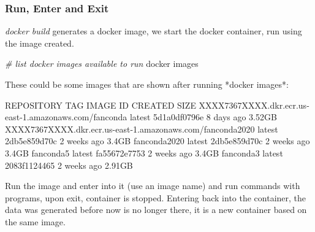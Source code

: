 \documentclass[
]{book}
\newenvironment{Shaded}{\begin{snugshade}}{\end{snugshade}}
\newcommand{\CommentTok}[1]{\textcolor[rgb]{0.56,0.35,0.01}{\textit{#1}}}
\newcommand{\ExtensionTok}[1]{#1}
\newcommand{\NormalTok}[1]{#1}
\begin{document}
\hypertarget{run-enter-and-exit}{%
\subsubsection{Run, Enter and Exit}\label{run-enter-and-exit}}

\emph{docker build} generates a docker image, we start the docker container, run using the image created.

\begin{Shaded}
\begin{Highlighting}[]
\CommentTok{\# list docker images available to run}
\ExtensionTok{docker}\NormalTok{ images}
\end{Highlighting}
\end{Shaded}

\begin{Shaded}
\begin{Highlighting}[]
\ExtensionTok{These}\NormalTok{ could be some images that are shown after running *docker images*:}

\ExtensionTok{REPOSITORY}\NormalTok{                                                     TAG                 IMAGE ID            CREATED             SIZE}
\ExtensionTok{XXXX7367XXXX.dkr.ecr.us{-}east{-}1.amazonaws.com/fanconda}\NormalTok{       latest              5d1a0df0796e        8 days ago          3.52GB}
\ExtensionTok{XXXX7367XXXX.dkr.ecr.us{-}east{-}1.amazonaws.com/fanconda2020}\NormalTok{   latest              2db5e859d70c        2 weeks ago         3.4GB}
\ExtensionTok{fanconda2020}\NormalTok{                                                latest              2db5e859d70c        2 weeks ago         3.4GB}
\ExtensionTok{fanconda5}\NormalTok{                                                   latest              fa55672e7753        2 weeks ago         3.4GB}
\ExtensionTok{fanconda3}\NormalTok{                                                   latest              2083f1124465        2 weeks ago         2.91GB}
\end{Highlighting}
\end{Shaded}

Run the image and enter into it (use an image name) and run commands with programs, upon exit, container is stopped. Entering back into the container, the data was generated before now is no longer there, it is a new container based on the same image.
\end{document}
